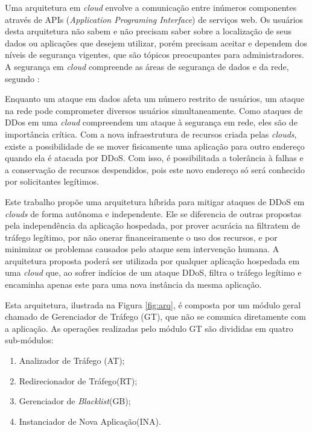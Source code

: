 

Uma arquitetura em \emph{cloud} envolve a comunicação entre inúmeros componentes através de APIs (\emph{Application Programing Interface}) de serviços web. Os usuários desta arquitetura não sabem e não precisam saber sobre a localização de seus dados ou aplicações que desejem utilizar, porém precisam aceitar e dependem  dos níveis de segurança vigentes, que são tópicos preocupantes para administradores.
A segurança em \emph{cloud} compreende as áreas de segurança de dados e da rede, segundo \cite{Dhage:2011:IDS:1980022.1980076}:  

Enquanto um ataque em dados afeta um número restrito de usuários, um ataque na rede pode comprometer diversos usuários simultaneamente. Como ataques de DDos em uma \emph{cloud} compreendem um ataque à segurança em rede, eles são de importância crítica.  
%
Com a nova infraestrutura de recursos criada pelas \emph{clouds}, existe a possibilidade de se mover fisicamente uma aplicação para outro endereço quando ela é atacada por DDoS. Com isso, é possibilitada a tolerância à falhas e a conservação de recursos despendidos, pois este novo endereço só será conhecido por solicitantes legítimos.

Este trabalho propõe uma arquitetura híbrida para mitigar ataques de DDoS em \emph{clouds} de forma autônoma e independente. Ele se diferencia de outras propostas pela independência da aplicação hospedada, por prover acurácia na filtratem de tráfego legítimo, por não onerar financeiramente o uso dos recursos, e por minimizar os problemas causados pelo ataque sem intervenção humana.
%
A arquitetura proposta poderá ser utilizada por qualquer aplicação hospedada em uma \emph{cloud} que, ao sofrer indícios de um ataque DDoS, filtra o tráfego legítimo e encaminha apenas este para uma nova instância da mesma aplicação. 

Esta arquitetura, ilustrada na Figura \ref{fig:arq}, é composta por um módulo geral chamado de Gerenciador de Tráfego (GT), que não se comunica diretamente com a aplicação. As operações realizadas pelo módulo GT são divididas em quatro sub-módulos:


\begin{enumerate}[i]
  \item Analizador de Tráfego (AT);
  \item Redirecionador de Tráfego(RT);
  \item Gerenciador de \emph{Blacklist}(GB);
  \item Instanciador de Nova Aplicação(INA).
\end{enumerate}

